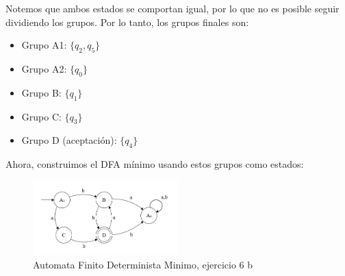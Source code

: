 \begin{enumerate}
    Notemos que ambos estados se comportan igual, por lo que no es posible seguir dividiendo los grupos. Por lo tanto, los grupos finales son:\\
    \begin{itemize} 
        \item Grupo A1: $\{q_2, q_5\}$
        \item Grupo A2: $\{q_0\}$
        \item Grupo B: $\{q_1\}$
        \item Grupo C: $\{q_3\}$
        \item Grupo D (aceptación): $\{q_4\}$   
    \end{itemize}
    Ahora, construimos el DFA mínimo usando estos grupos como estados: \\
    \begin{figure}[h!]
        \centering
        \includegraphics[width=0.5\textwidth]{images/6bresuelto.png}
        \caption{Automata Finito Determinista Minimo, ejercicio 6 b}
    \end{figure}
\end{enumerate}